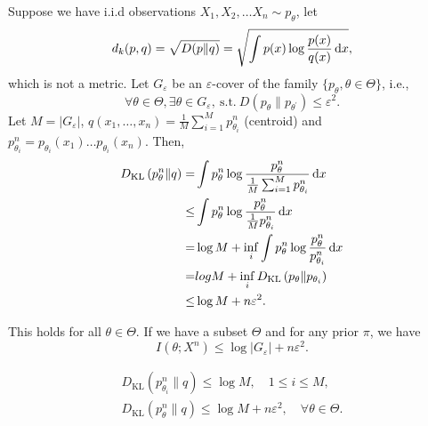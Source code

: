 Suppose we have i.i.d observations $X_{1},X_{2},\ldots X_{n}\sim p_{\theta}$, let
\begin{equation}
	d_{k}(p,q)=\sqrt{D(p\|q)}=\sqrt{\int p(x)\log\frac{p(x)}{q(x)}\mathop{}\!\mathrm{d} x},
\end{equation}
which is not a metric. Let $G_{\varepsilon}$ be an $\varepsilon$-cover of the family $\{p_{\theta},\theta\in\Theta\}$, i.e.,
\begin{equation}
	\forall\theta\in\Theta,\exists\theta\in G_{\varepsilon},\ \text{s.t.}\ D\left(p_{\theta}\|p_{\theta^{\prime}}\right)\leq\varepsilon^{2}.
\end{equation}
Let $M=\left|G_{\varepsilon}\right|$, $q(x_{1},\ldots,x_{n})=\frac{1}{M}\sum_{i=1}^{M}p_{\theta_{i}}^{n}$ (centroid) and $p_{\theta_{i}}^{n}=p_{\theta_{i}}(x_{1})\ldots p_{\theta_{i}}(x_{n})$. Then,
\begin{equation}
	\begin{aligned}
		D_{\text{KL}}\left(p_{\theta}^{n}\|q\right)= & \int p_{\theta}^{n}\log\frac{p_{\theta}^{n}}{\frac{1}{M}\sum_{i=1}^{M}p_{\theta_{i}}^{n}}\mathop{}\!\mathrm{d} x \\
		\leq                                         & \int p_{\theta}^{n}\log\frac{p_{\theta}^{n}}{\frac{1}{M}p_{\theta_{i}}^{n}}\mathop{}\!\mathrm{d} x               \\
		=                                            & \log M+\inf_{i}\int p_{\theta}^{n}\log\frac{p_{\theta}^{n}}{p_{\theta_{i}}^{n}}\mathop{}\!\mathrm{d} x           \\
		=                                            & log M+\inf_{i}D_{\text{KL}}\left(p_{\theta}\|p_{\theta_{i}}\right)                              \\
		\leq                                         & \log M+n\varepsilon^{2}.
	\end{aligned}
\end{equation}

This holds for all $\theta\in\Theta$. If we have a subset $\Theta$ and for any prior $\pi$, we have
\begin{equation}
	I\left(\theta;X^{n}\right)\leq\log|G_{\varepsilon}|+n\varepsilon^{2}.
\end{equation}

\begin{gather*}
	D_{\text{KL}}\left(p_{\theta_{i}}^{n}\|q\right)\leq\log M,\quad 1\leq i \leq M,\\
	D_{\text{KL}}\left(p_{\theta}^{n}\|q\right)\leq\log M+n\varepsilon^{2},\quad\forall\theta\in\Theta.
\end{gather*}

